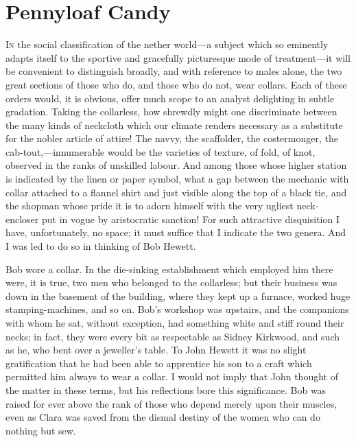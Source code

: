 \chapter{Pennyloaf Candy}

\textsc{In} the social classification of the nether world---a subject
which so eminently adapts itself to the sportive and gracefully
picturesque mode of treatment---it will be convenient to distinguish
broadly, and with reference to males alone, the two great sections of
those who do, and those who do not, wear collars. Each of these orders
would, it is obvious, offer much scope to an analyst delighting in
subtle gradation. Taking the collarless, how shrewdly might one
discriminate between the many kinds of neckcloth which our climate
renders necessary as a substitute for the nobler article of attire! The
navvy, the scaffolder, the costermonger, the cab-tout,---innumerable
would be the varieties of texture, of fold, of knot, observed in the
ranks of {}unskilled labour. And among those whose higher station is
indicated by the linen or paper symbol, what a gap between the mechanic
with collar attached to a flannel shirt and just visible along the top
of a black tie, and the shopman whose pride it is to adorn himself with
the very ugliest neck-encloser put in vogue by aristocratic sanction!
For such attractive disquisition I have, unfortunately, no space; it
must suffice that I indicate the two genera. And I was led to do so in
thinking of Bob Hewett.

Bob wore a collar. In the die-sinking establishment which employed him
there were, it is true, two men who belonged to the collarless; but
their business was down in the basement of the building, where they kept
up a furnace, worked huge stamping-machines, and so on. Bob's workshop
was upstairs, and the companions with whom he sat, without exception,
had something white and stiff round their necks; in fact, they were
every bit as respectable as Sidney Kirkwood, and such as he, who bent
over a {}jeweller's table. To John Hewett it was no slight gratification
that he had been able to apprentice his son to a craft which permitted
him always to wear a collar. I would not imply that John thought of the
matter in these terms, but his reflections bore this significance. Bob
was raised for ever above the rank of those who depend merely upon their
muscles, even as Clara was saved from the dismal destiny of the women
who can do nothing but sew.

